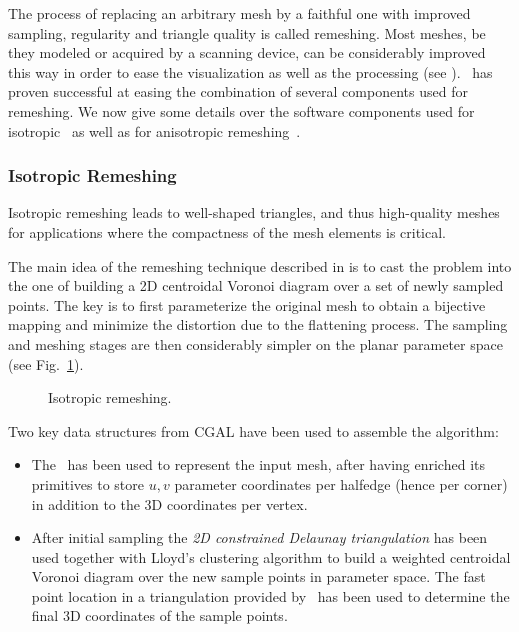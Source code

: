 \label{sec:remeshing}


The process of replacing an arbitrary mesh by a faithful one with
improved sampling, regularity and triangle quality is called
remeshing. Most meshes, be they modeled or acquired by a scanning
device, can  be considerably improved this way in order to ease the
visualization as well as the processing (see \cite{ss-dgp-01}). \cgal\
has proven successful at easing the combination of several components
used for remeshing. We now give some details over the software
components used for isotropic~\cite{acdi-isr-03} as well as for
anisotropic remeshing~\cite{acdld-apr-03}.

\subsubsection{Isotropic Remeshing}


Isotropic remeshing leads to well-shaped triangles, and thus
high-quality meshes for applications where the compactness of the mesh
elements is critical.


The main idea of the remeshing technique described in
\cite{acdi-isr-03} is to cast the problem into the
one of building a 2D centroidal Voronoi diagram over a set of newly
sampled points. The key is to first parameterize the original mesh to
obtain a bijective mapping and minimize the distortion due to the
flattening process. The sampling and meshing stages are then
considerably simpler on the planar parameter space (see
Fig.~\ref{fig:isotropic}).

\begin{figure}
  \centering
  \caption{Isotropic remeshing.}
  \label{fig:isotropic}\vspace{-3mm}
\end{figure}



Two key data structures from CGAL have been used to assemble the
algorithm:

\begin{itemize}

\item 
The \cgalpoly\ has been used to represent the input mesh, after
having enriched its primitives to store $u,v$ parameter coordinates
per halfedge (hence per corner) in addition to the 3D coordinates per
vertex.

\item 
After initial sampling the \emph{2D constrained Delaunay
triangulation} has been used together with Lloyd's clustering
algorithm to build a weighted centroidal Voronoi diagram over the new
sample points in parameter space. The fast point location in a
triangulation provided by \cgal\ has been used to determine the final 3D
coordinates of the sample points.

\end{itemize}

